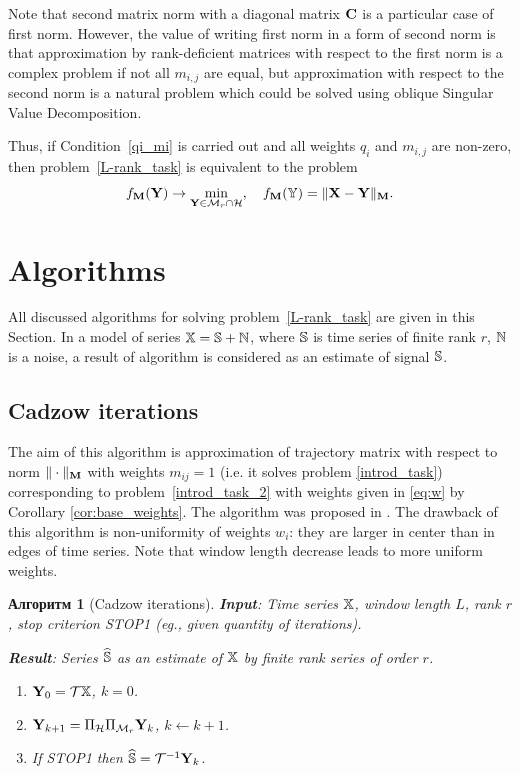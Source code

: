 \documentclass[12pt,a4paper,fleqn,leqno]{article}
\newtheorem{algorithm}{Алгоритм}
\begin{document}
Note that second matrix norm with a diagonal matrix $\mathbf{C}$ is a particular case of first norm. However, the value of writing first norm in a form of second norm is that approximation by rank-deficient matrices with respect to the first norm is a complex problem if not all $m_{i,j}$ are equal, but approximation with respect to the second norm is a natural problem which could be solved using oblique Singular Value Decomposition.

\begin{remark}
\label{rem:2tasks}
Thus, if Condition~\eqref{qi_mi} is carried out and all weights $q_i$ and $m_{i,j}$ are non-zero, then problem~\eqref{L-rank_task}
is equivalent to the problem
\begin{equation*}
\label{rank_task}
    f_{\mathbf{M}}(\mathbf{Y}) \to \min_{\mathbf{Y} \in \mathcal{M}_r \cap \mathcal{H}}, \quad f_{\mathbf{M}}(\mathbb{Y}) = \|\mathbf{X}-\mathbf{Y}\|_{\mathbf{M}}.
\end{equation*}
\end{remark}

\section{Algorithms}
\label{sec:alg}
All discussed algorithms for solving problem~\eqref{L-rank_task} are given in this Section.
In a model of series $\mathbb{X}=\mathbb{S}+\mathbb{N}$, where $\mathbb{S}$ is time series of finite rank $r$, $\mathbb{N}$ is a noise, a result of algorithm is considered as an estimate of signal $\mathbb{S}$.

\subsection{Cadzow iterations}
The aim of this algorithm is approximation of trajectory matrix with respect to norm $\|\cdot\|_{\mathbf{M}}$ with weights $m_{ij}=1$ (i.e. it solves problem \eqref{introd_task}) corresponding to problem~\eqref{introd_task_2} with weights given in \eqref{eq:w} by Corollary \ref{cor:base_weights}. The algorithm was proposed in \cite{Cadzow1988}. The drawback of this algorithm is non-uniformity of weights $w_i$: they are larger in center than in edges of time series. Note that window length decrease leads to more uniform weights.
	
\begin{algorithm}[Cadzow iterations]
\textbf{Input}: Time series $\mathbb{X}$, window length $L$, rank $r$,
stop criterion STOP1 (eg., given quantity of iterations).

\textbf{Result}:
Series $\widehat{\mathbb{S}}$ as an estimate of $\mathbb{X}$ by finite rank series of order $r$.

\begin{enumerate}
\item
$\mathbf{Y}_0 = \mathcal{T} \mathbb{X}$, $k=0$.
\item
$\mathbf{Y}_{k+1} = \Pi_{\mathcal{H}}  \Pi_{\mathcal{M}_r} \mathbf{Y}_{k}$, $k\leftarrow k+1$.
\item
If STOP1 then $\widehat{\mathbb{S}} = \mathcal{T}^{-1} \mathbf{Y}_k$.
\end{enumerate}
\end{algorithm}
\end{document}
